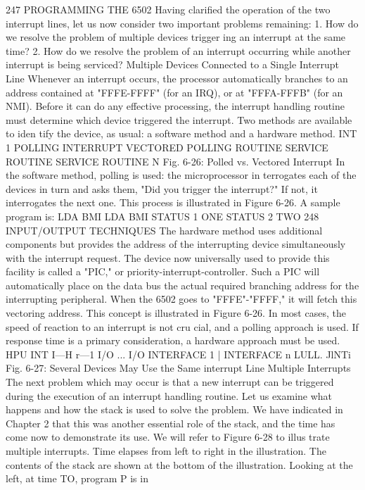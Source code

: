 247
PROGRAMMING THE 6502
Having clarified the operation of the two interrupt lines, let us
now consider two important problems remaining:
1. How do we resolve the problem of multiple devices trigger
ing an interrupt at the same time?
2. How do we resolve the problem of an interrupt occurring
while another interrupt is being serviced?
Multiple Devices Connected to a Single Interrupt Line
Whenever an interrupt occurs, the processor automatically
branches to an address contained at "FFFE-FFFF" (for an IRQ),
or at "FFFA-FFFB" (for an NMI). Before it can do any effective
processing, the interrupt handling routine must determine which
device triggered the interrupt. Two methods are available to iden
tify the device, as usual: a software method and a hardware
method.
INT 1 POLLING INTERRUPT VECTORED
POLLING
ROUTINE
SERVICE
ROUTINE
SERVICE
ROUTINE N
Fig. 6-26: Polled vs. Vectored Interrupt
In the software method, polling is used: the microprocessor in
terrogates each of the devices in turn and asks them, "Did you
trigger the interrupt?" If not, it interrogates the next one. This
process is illustrated in Figure 6-26. A sample program is:
LDA
BMI
LDA
BMI
STATUS 1
ONE
STATUS 2
TWO
248
INPUT/OUTPUT TECHNIQUES
The hardware method uses additional components but provides
the address of the interrupting device simultaneously with the
interrupt request. The device now universally used to provide this
facility is called a "PIC," or priority-interrupt-controller. Such a
PIC will automatically place on the data bus the actual required
branching address for the interrupting peripheral. When the
6502 goes to "FFFE"-"FFFF," it will fetch this vectoring address.
This concept is illustrated in Figure 6-26.
In most cases, the speed of reaction to an interrupt is not cru
cial, and a polling approach is used. If response time is a primary
consideration, a hardware approach must be used.
HPU
INT
I—H r—1
I/O ... I/O
INTERFACE 1 | INTERFACE n
LULL. JlNTi
Fig. 6-27: Several Devices May Use the Same interrupt Line
Multiple Interrupts
The next problem which may occur is that a new interrupt can
be triggered during the execution of an interrupt handling
routine. Let us examine what happens and how the stack is used
to solve the problem. We have indicated in Chapter 2 that this
was another essential role of the stack, and the time has come
now to demonstrate its use. We will refer to Figure 6-28 to illus
trate multiple interrupts. Time elapses from left to right in the
illustration. The contents of the stack are shown at the bottom of
the illustration. Looking at the left, at time TO, program P is in
